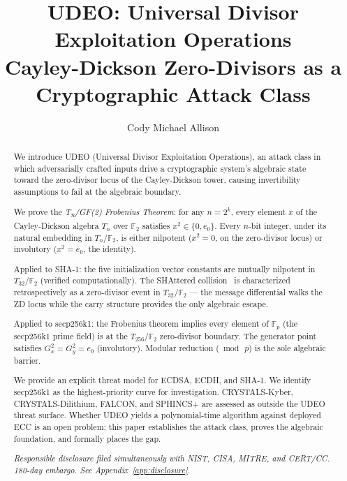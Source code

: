 \documentclass[runningheads]{llncs}
\theoremstyle{plain}
\theoremstyle{definition}
\newcommand{\GFtwo}{\mathbb{F}_2}
\begin{document}
\title{UDEO: Universal Divisor Exploitation Operations\\
{\small Cayley-Dickson Zero-Divisors as a Cryptographic Attack Class}}

\author{Cody Michael Allison}

\maketitle

\begin{abstract}
We introduce UDEO (Universal Divisor Exploitation Operations), an attack
class in which adversarially crafted inputs drive a cryptographic system's
algebraic state toward the zero-divisor locus of the Cayley-Dickson tower,
causing invertibility assumptions to fail at the algebraic boundary.

We prove the \emph{T\textsubscript{n}/GF(2) Frobenius Theorem}: for any
$n = 2^k$, every element $x$ of the Cayley-Dickson algebra $T_n$ over
$\GFtwo$ satisfies $x^2 \in \{0, e_0\}$. Every $n$-bit integer, under
its natural embedding in $T_n/\GFtwo$, is either nilpotent ($x^2 = 0$,
on the zero-divisor locus) or involutory ($x^2 = e_0$, the identity).

Applied to SHA-1: the five initialization vector constants are mutually
nilpotent in $T_{32}/\GFtwo$ (verified computationally). The SHAttered
collision~\cite{Stevens2017} is characterized retrospectively as a
zero-divisor event in $T_{32}/\GFtwo$ — the message differential
walks the ZD locus while the carry structure provides the only
algebraic escape.

Applied to secp256k1: the Frobenius theorem implies every element of
$\mathbb{F}_p$ (the secp256k1 prime field) is at the $T_{256}/\GFtwo$
zero-divisor boundary. The generator point satisfies $G_x^2 = G_y^2 = e_0$
(involutory). Modular reduction ($\bmod\, p$) is the sole algebraic barrier.

We provide an explicit threat model for ECDSA, ECDH, and SHA-1. We identify
secp256k1 as the highest-priority curve for investigation. CRYSTALS-Kyber,
CRYSTALS-Dilithium, FALCON, and SPHINCS+ are assessed as outside the UDEO
threat surface. Whether UDEO yields a polynomial-time algorithm against
deployed ECC is an open problem; this paper establishes the attack class,
proves the algebraic foundation, and formally places the gap.

\emph{Responsible disclosure filed simultaneously with NIST, CISA, MITRE,
and CERT/CC. 180-day embargo. See Appendix~\ref{app:disclosure}.}
\end{abstract}
\end{document}
